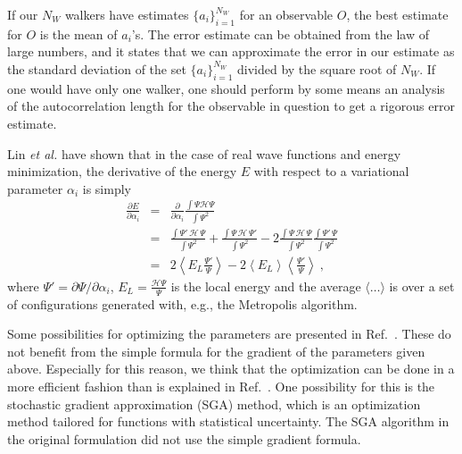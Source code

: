 \documentclass{article}
\begin{document}
If our $N_W$ walkers have estimates $\{a_i\}_{i=1}^{N_W}$ for an
observable $O$, the best estimate for $O$ is the mean of $a_i$'s. The
error estimate can be obtained from the law of large numbers, and it
states that we can approximate the error in our estimate as the
standard deviation of the set $\{a_i\}_{i=1}^{N_W}$ divided by the
square root of $N_W$. If one would have only one walker, one should
perform by some means an analysis of the autocorrelation length for
the observable in question to get a rigorous error estimate.

Lin {\it et al.}\cite{anad} have shown that in the case of real wave
functions and energy minimization, the derivative of the energy $E$
with respect to a variational parameter $\alpha_i$ is simply
\begin{eqnarray}
\frac{\partial E}{\partial \alpha_i} &=& 
\frac{\partial }{\partial \alpha_i} \frac{\int \Psi \mathcal{H} \Psi}{\int \Psi^2}
\nonumber\\
&=&
\frac{\int \Psi' \, \mathcal{H} \, \Psi}{\int \Psi^2}
+\frac{\int \Psi \, \mathcal{H} \, \Psi'}{\int \Psi^2} 
-2 \frac{\int \Psi \, \mathcal{H} \, \Psi }{\int \Psi^2}
 \frac{\int \Psi' \, \Psi}{\int \Psi^2}
\nonumber\\
&=& 
2\left\langle E_L 
\frac{\Psi'}{\Psi} \right\rangle -2\left\langle E_L\right\rangle 
\left\langle \frac{\Psi'}{\Psi} \right\rangle \ ,
\label{anaa}
\end{eqnarray}
%
where $\Psi'={\partial \Psi}/{\partial \alpha_i}$,
$E_L=\frac{\mathcal{H}\Psi}{\Psi}$ is the local energy and the average
$\langle \dots \rangle$ is over a set of configurations generated
with, e.g., the Metropolis algorithm\cite{anad}.

Some possibilities for optimizing the parameters are presented in
Ref.~. These do not benefit from the simple formula
for the gradient of the parameters given above. Especially for this
reason, we think that the optimization can be done in a more efficient
fashion than is explained in Ref.~. One possibility
for this is the stochastic gradient approximation (SGA)
method\cite{sga}, which is an optimization method tailored for
functions with statistical uncertainty. The SGA algorithm in the
original formulation did not use the simple gradient formula.
\end{document}
